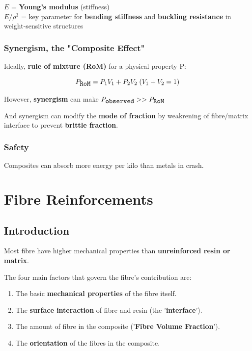 \documentclass{NoteThesis/note-thesis}
\begin{document}
$E$ = \textbf{Young's modulus} (stiffness)\\
$E/\rho ^3$ = key parameter for \textbf{bending stiffness} and \textbf{buckling resistance} in weight-sensitive structures

\subsubsection*{Synergism, the "Composite Effect"}

Ideally, \textbf{rule of mixture (RoM)} for a physical property P:

$$
P_{\verb|RoM|} = P_1 V_1 + P_2 V_2\; (V_1+V_2 = 1)
$$

However, \textbf{synergism} can make $P_{\verb|observed|} >> P_{\verb|RoM|}$

And synergism can modify the \textbf{mode of fraction} by weakrening of fibre/matrix interface to prevent \textbf{brittle fraction}.


\subsubsection*{Safety}

Composites can absorb more energy per kilo than metals in crash.

\section{Fibre Reinforcements}

\subsection{Introduction}

Most fibre have higher mechanical properties than \textbf{unreinforced resin or matrix}.

The four main factors that govern the fibre's contribution are:

\begin{enumerate}
    \item The basic \textbf{mechanical properties} of the fibre itself.
    \item The \textbf{surface interaction} of fibre and resin (the '\textbf{interface}').
    \item The amount of fibre in the composite ('\textbf{Fibre Volume Fraction}').
    \item The \textbf{orientation} of the fibres in the composite.
\end{enumerate}
\end{document}
